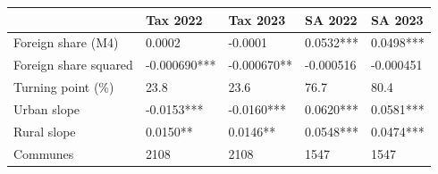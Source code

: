 \begin{tabular}{lllll}
\toprule
 & Tax 2022 & Tax 2023 & SA 2022 & SA 2023 \\
\midrule
Foreign share (M4) & 0.0002 & -0.0001 & 0.0532*** & 0.0498*** \\
Foreign share squared & -0.000690*** & -0.000670** & -0.000516 & -0.000451 \\
Turning point (\%) & 23.8 & 23.6 & 76.7 & 80.4 \\
Urban slope & -0.0153*** & -0.0160*** & 0.0620*** & 0.0581*** \\
Rural slope & 0.0150** & 0.0146** & 0.0548*** & 0.0474*** \\
Communes & 2108 & 2108 & 1547 & 1547 \\
\bottomrule
\end{tabular}
